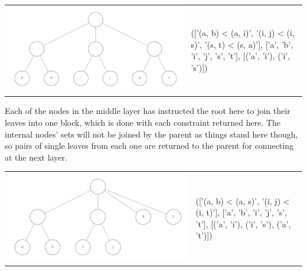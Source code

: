 \documentclass[11pt]{article} %
\begin{document}
\hfill

\begin{center}
\begin{tabular}{>{\centering}m{} >{\centering\arraybackslash}m{}}
	\includegraphics[scale=0.1]{traverse4} & (['(a, b) < (a, i)', '(i, j) < (i, s)', '(s, t) < (s, a)'], ['a', 'b', 'i', 'j', 's', 't'], [('a', 'i'), ('i', 's')])
\end{tabular}
\end{center}
Each of the nodes in the middle layer has instructed the root here to join their leaves into one block, which is done with each constraint returned here. The internal nodes' sets will not be joined by the parent as things stand here though, so pairs of single leaves from each one are returned to the parent for connecting at the next layer.

\hfill

\begin{center}
\begin{tabular}{>{\centering}m{} >{\centering\arraybackslash}m{}}
	\includegraphics[scale=0.1]{traverse5} & (['(a, b) < (a, s)', '(i, j) < (i, t)'], ['a', 'b', 'i', 'j', 's', 't'], [('a', 'i'), ('i', 's'), ('a', 't')])
\end{tabular}
\end{center}
\end{document}
